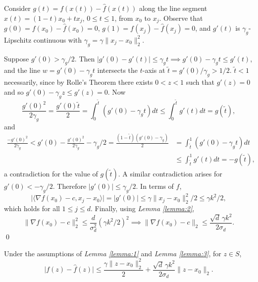 \documentclass[smallextended,final]{svjour3}  %
\begin{document}
\begin{proofdot}
  \def\g{\gamma_g}
  Consider $g(t)=f(x(t)) - \hat f(x(t))$ along
  the line segment $x(t)=(1-t)x_0 + tx_j$, $0\le t\le1$, from $x_0$ to
  $x_j$.  Observe that $g(0)=f(x_0) - \hat f(x_0) = 0$, $g(1)=f(x_j) -
  \hat f(x_j) = 0$, and $g'(t)$ is $\g$-Lipschitz continuous with $\g
  = \gamma \|x_j-x_0\|_2^2$.

  Suppose $g'(0) > \g/2$. Then $|g'(0)-g'(t)| \le \g t \implies g'(0)
  - \g t \le g'(t)$, and the line $w=g'(0)-\g t$ intersects the
  $t$-axis at $\tilde t=g'(0)/\g > 1/2$. $\tilde t<1$ necessarily,
  since by Rolle's Theorem there exists $0<z<1$ such that $g'(z)=0$
  and so $g'(0) - \g z \le g'(z) = 0$. Now
  $$\frac{g'(0)^2}{2\g} = \frac{g'(0)\tilde t}{2} = \int_0^{\tilde t}
  (g'(0)-\g t)dt \le \int_0^{\tilde t} g'(t)dt = g(\tilde t),$$ and
  \begin{align*}
    \frac{-g'(0)^2}{2\g} < g'(0) - \frac{g'(0)^2}{2\g} - \g/2 =
    \frac{(1-\tilde t)(g'(0)-\g)}{2} &= \int_{\tilde t}^1 (g'(0)-\g
    t)dt \\ &\le \int_{\tilde t}^1 g'(t)dt = -g(\tilde t),
  \end{align*}
  \noindent a contradiction for the value of $g(\tilde t)$. A similar
  contradiction arises for $g'(0)<-\g/2$. Therefore $|g'(0)| \le
  \g/2$. In terms of $f$,
  $$\bigl|\langle \nabla f(x_0)-c,x_j-x_0\rangle\bigr| = |g'(0)| \le
  \gamma \|x_j-x_0\|_2^2/2 \le \gamma k^2 / 2,$$ which holds for all
  $1\le j\le d$.  Finally, using {\it Lemma \ref{lemma:2}},
  $$\|\nabla f(x_0)-c\|_2^2 \le \frac{d}{\sigma_d^2}(\gamma k^2/2)^2
  \implies \|\nabla f(x_0)-c\|_2 \le \frac{\sqrt{d} \, \gamma
    k^2}{2\sigma_d}.$$ \qed
\end{proofdot}

\begin{onetheorem}
  Under the assumptions of {\it Lemma \ref{lemma:1}} and {\it Lemma
    \ref{lemma:3}}, for $z \in S$,
  $$ \big|f(z) - \hat f(z)\big| \leq \frac{\gamma \|z - x_0\|_2^2}{2} + \frac{\sqrt{d} \, \gamma k^2}{2 \sigma_d} \|z - x_0\|_2.$$
\end{onetheorem}
\end{document}
